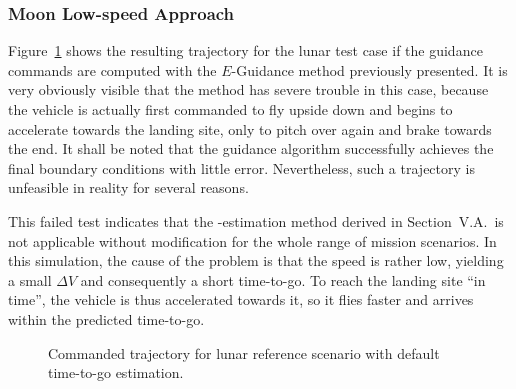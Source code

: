 \documentclass[%
]{aiaa-tc}
\begin{document}
\subsubsection{Moon Low-speed Approach}

Figure~\ref{fig:moonfail} shows the resulting trajectory for the lunar test case
if the guidance commands are computed with the $E$-Guidance method previously
presented. It is very obviously visible that the method has severe trouble in this case,
because the vehicle is actually first commanded to fly upside down and begins to accelerate
towards the landing site, only to pitch over again and brake towards the end. It
shall be noted that the guidance algorithm successfully achieves the final
boundary conditions with little error. Nevertheless, such a trajectory is
unfeasible in reality for several reasons.

This failed test indicates that the \tgo-estimation method derived in
Section~V.A.\ is not applicable without modification for the whole range of
mission scenarios. In this simulation, the cause of the problem is that the
speed is rather low, yielding a small $\Delta V$ and consequently a short
time-to-go. To reach the landing site ``in time'', the vehicle is thus
accelerated towards it, so it flies faster and arrives within the predicted
time-to-go.

\begin{figure}
    \centering\small
    \caption{Commanded trajectory for lunar reference scenario with default
        time-to-go estimation.}
    \label{fig:moonfail}
\end{figure}
\end{document}
